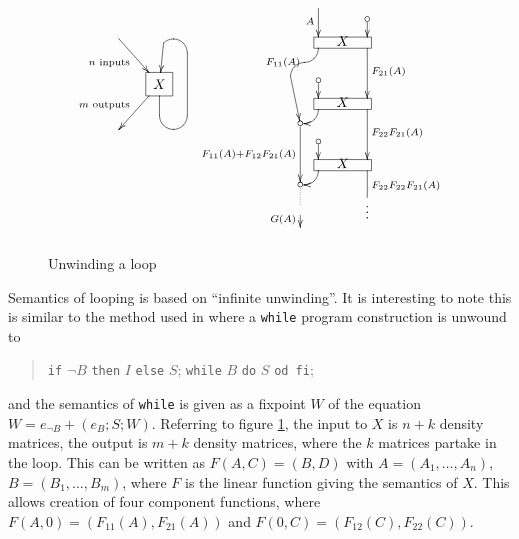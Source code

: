 \begin{figure}
\[
  \xymatrix@!C@C=1em@R-.7ex{
    *[.]{}
    &&\\
    *[.]{} \ar[dr]_<>(.5){n \text{ inputs}}
    &&
    \\
    &*+<10pt>[F-]{X}\ar[dl]_<>(.5){m \text{ outputs}}
     \ar`d[dr]`^u`[u]`^dl[][]
    &&
    *[.]{}
    \\
    *[.]{}
    &&
    *[.]{}
    &&
    *[.]{}
  } \hskip-6em
  \xymatrix@C=7pt@R=5pt@H+2pt{
    & \ar[dd]_{A} & & \\
    &  & & *{\circ}\ar[d] \\
    &\save [].[rr]!C="b1"*[F] \frm{}\restore \ar`d[dl]`[dddd]^{F_{11}(A)}[ldddd] & *+{X}
      & \ar[ddd]^{F_{21}(A)}\\
    & & &\\
      & *{\circ} \ar[d]& & \\
    &\save [].[rr]!C="b2"*[F] \frm{}\restore \ar`d[dl][dl] & *+{X} &\ar[ddd]^{F_{22}F_{21}(A)}\\
    *{\circ} \ar[ddd]_{F_{11}(A)+F_{12}F_{21}(A)}& & & \\
     & *{\circ} \ar[d]& & \\
    &\save [].[rr]!C="b2"*[F] \frm{}\restore   \ar`d[dl][dl] & *+{X}
      &\ar@{-}[dd]^{F_{22}F_{22}F_{21}(A)}\\
    *{\circ} \ar@{. }[d]& & &\\
    \ar[d]_{G(A)} & & & *{\vdots}\\
    & & &
  }
\]
\caption{Unwinding a loop}\label{fig:loopunwinding}
\end{figure}


Semantics of looping is based on ``infinite unwinding''. It is interesting to note this is similar
to the method used in \cite{kozen-semanticsprobabilistic} where a \texttt{while} program
construction is unwound to
\begin{quote}
  \texttt{if} $\neg B$ \texttt{then} $I$ \texttt{else} $S$; \texttt{while} $B$ \texttt{do} $S$
  \texttt{od fi};
\end{quote}
and the semantics of \texttt{while} is given as a fixpoint $W$ of the equation $W=e_{\neg B} +
(e_{B} ; S ; W)$. Referring to figure \ref{fig:loopunwinding}, the input to $X$ is $n+k$ density
matrices, the output is $m+k$ density matrices, where the $k$ matrices partake in the loop. This
can be written as $F(A,C) = (B,D)$ with $A=(A_{1},\ldots,A_{n})$, $B=(B_{1},\ldots,B_{m})$, where
$F$ is the linear function giving the semantics of $X$. This allows creation of four component
functions, where $F(A,0) = (F_{11}(A),F_{21}(A))$ and $F(0,C) = (F_{12}(C),F_{22}(C))$.

